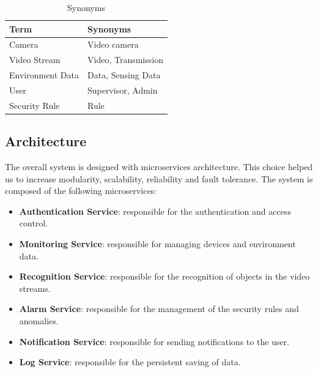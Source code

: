 \documentclass{scrartcl}
\begin{document}
    \renewcommand{\arraystretch}{1.8}
    \begin{table}
        \centering
        \begin{tabularx}{0.6\textwidth}{ | >{\centering\arraybackslash}X | >{\centering\arraybackslash}X | }
            \hline
            \textbf{Term} & \textbf{Synonyms} \\
            \hline
            Camera & Video camera \\
            \hline
            Video Stream & Video, Transmission \\
            \hline
            Environment Data & Data, Sensing Data \\
            \hline
            User & Supervisor, Admin \\
            \hline
            Security Rule & Rule \\
            \hline
        \end{tabularx}
        \caption{Synonyms}
        \label{tab:synonyms}
    \end{table}

    \subsection{Architecture}

    The overall system is designed with microservices architecture.
    This choice helped us to increase modularity, scalability, reliability and fault tolerance.
    The system is composed of the following microservices:

    \begin{itemize}
        \item \textbf{Authentication Service}: responsible for the authentication and access control.
        \item \textbf{Monitoring Service}: responsible for managing devices and environment data.
        \item \textbf{Recognition Service}: responsible for the recognition of objects in the video streams.
        \item \textbf{Alarm Service}: responsible for the management of the security rules and anomalies.
        \item \textbf{Notification Service}: responsible for sending notifications to the user.
        \item \textbf{Log Service}: responsible for the persistent saving of data.
    \end{itemize}
\end{document}
